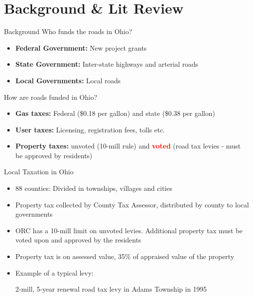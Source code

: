 \documentclass{beamer}
\begin{document}
\section{Background \& Lit Review}

\begin{frame}[label=who_funds_roads]{Background}
    Who funds the roads in Ohio?
    \begin{itemize}
        \item {\bf Federal Government: } New project grants
        \item {\bf State Government: } Inter-state highways and arterial roads
        \item {\bf Local Governments: } Local roads 
    \end{itemize}

    \begin{flushright}
        \hyperlink{odot_who_does_what}{}
    \end{flushright}

    How are roads funded in Ohio?
    \begin{itemize}
        \item {\bf Gas taxes:} Federal (\$0.18 per gallon) and state (\$0.38 per gallon)
        \item {\bf User taxes:} Licensing, registration fees, tolls etc.
        \item {\bf Property taxes:} unvoted (10-mill rule) and \textcolor{red}{\bf voted} (road tax levies - must be approved by residents) 
    \end{itemize}
\end{frame}

\begin{frame}{Local Taxation in Ohio}
    \begin{itemize}
        \item 88 counties: Divided in townships, villages and cities
        \item Property tax collected by County Tax Assessor, distributed by county to local governments
        \item ORC has a 10-mill limit on unvoted levies. Additional property tax must be voted upon and approved by the residents
        \item Property tax is on assessed value, 35\% of appraised value of the property
        \item Example of a typical levy:

        2-mill, 5-year renewal road tax levy in Adams Township in 1995

    \end{itemize}
\end{frame}
\end{document}
